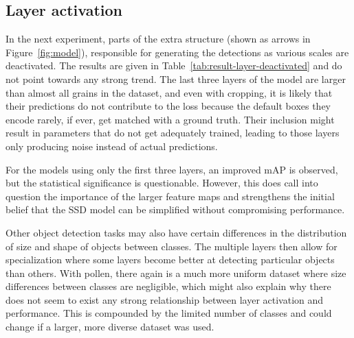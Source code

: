 \subsection{Layer activation}
In the next experiment, parts of the extra structure (shown as arrows in Figure~\ref{fig:model}), responsible for generating the detections as various scales are deactivated.
The results are given in Table~\ref{tab:result-layer-deactivated} and do not point towards any strong trend.
The last three layers of the model are larger than almost all grains in the dataset, and even with cropping, it is likely that their predictions do not contribute to the loss because the default boxes they encode rarely, if ever, get matched with a ground truth.
Their inclusion might result in parameters that do not get adequately trained, leading to those layers only producing noise instead of actual predictions.

For the models using only the first three layers, an improved mAP is observed, but the statistical significance is questionable.
However, this does call into question the importance of the larger feature maps and strengthens the initial belief that the SSD model can be simplified without compromising performance.

Other object detection tasks may also have certain differences in the distribution of size and shape of objects between classes.
The multiple layers then allow for specialization where some layers become better at detecting particular objects than others.
With pollen, there again is a much more uniform dataset where size differences between classes are negligible, which might also explain why there does not seem to exist any strong relationship between layer activation and performance.
This is compounded by the limited number of classes and could change if a larger, more diverse dataset was used.

